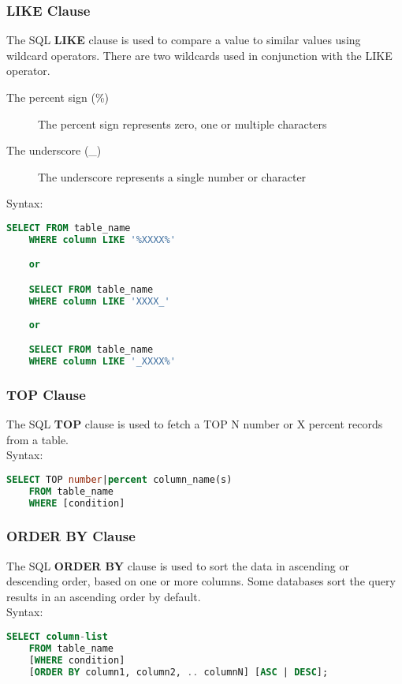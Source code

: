  \subsubsection*{{LIKE Clause}}
 The SQL \textbf{LIKE} clause is used to compare a value to similar values using wildcard operators. There are two wildcards used in conjunction with the LIKE operator.
 \begin{description}
     \item [The percent sign (\%)] {The percent sign represents zero, one or multiple characters}
     \item [The underscore (\_)] {The underscore represents a single number or character}
 \end{description}
 Syntax: 
 \begin{lstlisting}[language=SQL]
    SELECT FROM table_name
    WHERE column LIKE '%XXXX%'

    or

    SELECT FROM table_name
    WHERE column LIKE 'XXXX_'
    
    or

    SELECT FROM table_name
    WHERE column LIKE '_XXXX%'
 \end{lstlisting}
 
 \subsubsection*{{TOP Clause}}
 The SQL \textbf{TOP} clause is used to fetch a TOP N number or X percent records from a table.\\
 Syntax: 
 \begin{lstlisting}[language=SQL]
    SELECT TOP number|percent column_name(s)
    FROM table_name
    WHERE [condition]
 \end{lstlisting}
 
 \subsubsection*{{ORDER BY Clause}}
 The SQL \textbf{ORDER BY} clause is used to sort the data in ascending or descending order, based on one or more columns. Some databases sort the query results in an ascending order by default.\\
 Syntax: 
 \begin{lstlisting}[language=SQL]
    SELECT column-list 
    FROM table_name 
    [WHERE condition] 
    [ORDER BY column1, column2, .. columnN] [ASC | DESC];
 \end{lstlisting}
 
